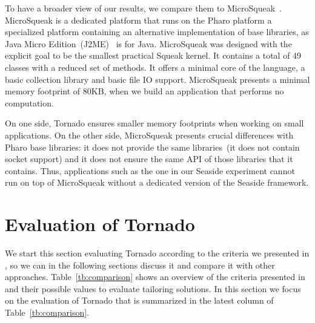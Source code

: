 To have a broader view of our results, we compare them to MicroSqueak~\cite{Malo11a}. MicroSqueak is a dedicated platform that runs on the Pharo platform \ie a specialized platform containing an alternative implementation of base libraries, as Java Micro Edition~(J2ME)~\cite{JavaME} is for Java. MicroSqueak was designed with the explicit goal to be the smallest practical Squeak kernel. It contains a total of 49 classes with a reduced set of methods. It offers a minimal core of the language, a basic collection library and basic file IO support. MicroSqueak presents a minimal memory footprint of 80KB, when we build an application that performs no computation.

On one side, Tornado ensures smaller memory footprints when working on small applications. On the other side, MicroSqueak presents crucial differences with Pharo base libraries: it does not provide the same libraries~(\eg it does not contain socket support) and it does not ensure the same API of those libraries that it contains. Thus, applications such as the one in our Seaside experiment cannot run on top of MicroSqueak without a dedicated version of the Seaside framework.

\section{Evaluation of Tornado}\label{sec:rfg_evaluation}

We start this section evaluating Tornado according to the criteria we presented in , so we can in the following sections discuss it and compare it with other approaches. Table~\ref{tb:comparison} shows an overview of the criteria presented in  and their possible values to evaluate tailoring solutions.
In this section we focus on the evaluation of Tornado that is summarized in the latest column of Table~\ref{tb:comparison}.

